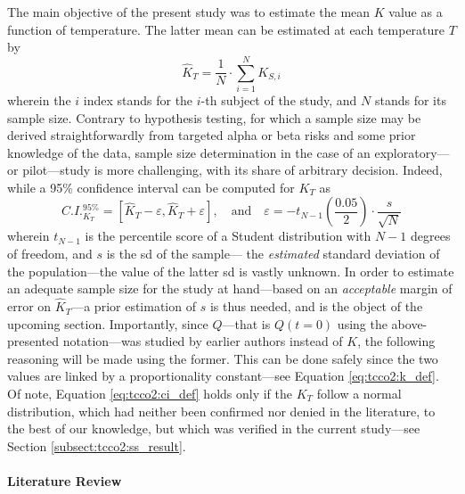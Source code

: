The main objective of the present study was to estimate the mean $K$ value as a function of temperature. The latter mean can be estimated at each temperature $T$ by
\begin{equation}
	\widehat{K}_{T} = \frac{1}{N} \cdot \sum_{i=1}^{N} K_{S,i}
\end{equation}
wherein the $i$ index stands for the $i$-th subject of the study, and $N$ stands for its sample size. Contrary to hypothesis testing, for which a sample size may be derived straightforwardly from targeted alpha or beta risks and some prior knowledge of the data\cite[Chap.~19]{ambrosius2007topics}\cite{chow2017sample}, sample size determination in the case of an exploratory---or pilot---study is more challenging, with its share of arbitrary decision\cite{ko2021}. Indeed, while a 95\% confidence interval can be computed for $K_T$ as
\begin{equation}\label{eq:tcco2:ci_def}
	C.I._{K_T}^{95\%} = [\widehat{K}_{T} - \varepsilon, \widehat{K}_{T} + \varepsilon], \quad \text{and} \quad \varepsilon = - t_{N-1}\left(\frac{0.05}{2}\right) \cdot \frac{s}{\sqrt{N}}
\end{equation}
wherein $t_{N-1}$ is the percentile score of a Student distribution with $N-1$ degrees of freedom, and $s$ is the \gls{sd} of the sample---\ie{} the \emph{estimated} standard deviation of the population---the value of the latter \gls{sd} is vastly unknown. In order to estimate an adequate sample size for the study at hand---based on an \emph{acceptable} margin of error on $\widehat{K}_T$---a prior estimation of $s$ is thus needed, and is the object of the upcoming section. Importantly, since $Q$---that is $Q(t=0)$ using the above-presented notation---was studied by earlier authors instead of $K$, the following reasoning will be made using the former. This can be done safely since the two values are linked by a proportionality constant---see Equation \ref{eq:tcco2:k_def}. Of note, Equation \ref{eq:tcco2:ci_def} holds only if the $K_T$ follow a normal distribution, which had neither been confirmed nor denied in the literature, to the best of our knowledge, but which was verified in the current study---see Section \ref{subsect:tcco2:ss_result}.

\paragraph{Literature Review}\mbox{}\\

